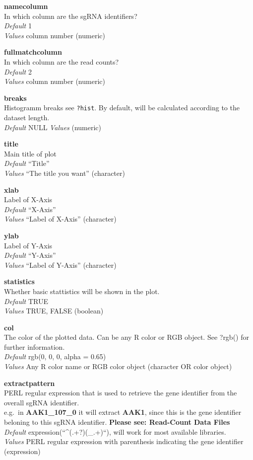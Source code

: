 \documentclass[]{article}
\begin{document}
\textbf{namecolumn}\\
In which column are the sgRNA identifiers?\\
\emph{Default} 1\\
\emph{Values} column number (numeric)

\textbf{fullmatchcolumn}\\
In which column are the read counts?\\
\emph{Default} 2\\
\emph{Values} column number (numeric)

\textbf{breaks}\\
Histogramm breaks see \texttt{?hist}. By default, will be calculated
according to the dataset length.\\
\emph{Default} NULL \emph{Values} (numeric)

\textbf{title}\\
Main title of plot\\
\emph{Default} ``Title''\\
\emph{Values} ``The title you want'' (character)

\textbf{xlab}\\
Label of X-Axis\\
\emph{Default} ``X-Axis''\\
\emph{Values} ``Label of X-Axis'' (character)

\textbf{ylab}\\
Label of Y-Axis\\
\emph{Default} ``Y-Axis''\\
\emph{Values} ``Label of Y-Axis'' (character)

\textbf{statistics}\\
Whether basic stattistics will be shown in the plot.\\
\emph{Default} TRUE\\
\emph{Values} TRUE, FALSE (boolean)

\textbf{col}\\
The color of the plotted data. Can be any R color or RGB object. See
?rgb() for further information.\\
\emph{Default} rgb(0, 0, 0, alpha = 0.65)\\
\emph{Values} Any R color name or RGB color object (character OR color
object)

\textbf{extractpattern}\\
PERL regular expression that is used to retrieve the gene identifier
from the overall sgRNA identifier.\\
e.g.~in \textbf{AAK1\_107\_0} it will extract \textbf{AAK1}, since this
is the gene identifier beloning to this sgRNA identifier. \textbf{Please
see: Read-Count Data Files}\\
\emph{Default} expression(``\^{}(.+?)(\_.+)``), will work for most
available libraries.\\
\emph{Values} PERL regular expression with parenthesis indicating the
gene identifier (expression)
\end{document}
